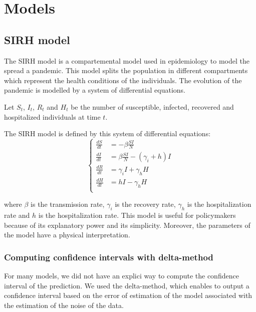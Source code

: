 \documentclass[12pt,a4paper]{report}
\begin{document}
\chapter{Models}

\cite{ref1}

\section{SIRH model}


The SIRH model is a compartemental model used in epidemiology to model the spread a pandemic. 
This model splits the population in different compartments which represent the health conditions of the individuals.
The evolution of the pandemic is modelled by a system of differential equations.

Let $S_t$, $I_t$, $R_t$ and $H_t$ be the number of susceptible, infected, recovered and hospitalized individuals at time $t$.

The SIRH model is defined by this system of differential equations:\\


\begin{equation}
    \begin{cases}
        \frac{dS}{dt} & = - \beta \frac{S I}{N} \\
        \frac{dI}{dt} & = \beta \frac{S I }{N} - (\gamma_i + h) I \\
        \frac{dR}{dt} & = \gamma_i I + \gamma_h H  \\
        \frac{dH}{dt} & = h I - \gamma_h H  \\
    \end{cases}
\end{equation}
    



where $\beta$ is the transmission rate, $\gamma_i$ is the recovery rate, $\gamma_h$ is the hospitalization rate and $h$ is the hospitalization rate.
This model is useful for policymakers because of its explanatory power and its simplicity.
Moreover, the parameters of the model have a physical interpretation. 

\subsection{Computing confidence intervals with delta-method}

For many models, we did not have an explici way to compute the confidence interval of the prediction. 
We used the delta-method, which enables to output a confidence interval based on the error of estimation of the model associated with the estimation of the noise of the data. 
\end{document}
